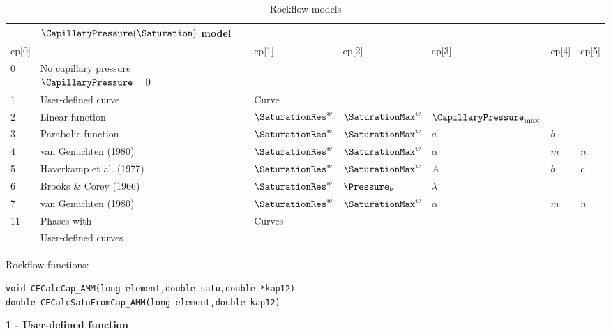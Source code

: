 \begin{table}[htb!]
\caption{Rockflow models} \label{tab:}
\begin{center}
\begin{tabular}{|ll|lllll|}
\hline
       & $\CapillaryPressure(\Saturation)$ model & & & & & \\
\hline
cp[0] &                     & cp[1] & cp[2] & cp[3] & cp[4] & cp[5]\\
\hline
0 & No capillary pressure $\CapillaryPressure = 0$   &       &       &       &       &\\
\hline
1 & User-defined curve      & Curve &       &       &       &\\
\hline
2 & Linear function         & $\SaturationRes^w$ & $\SaturationMax^w$ & ${\CapillaryPressure}_{\mbox{\footnotesize max}}$  & & \\
\hline
3 & Parabolic function      & $\SaturationRes^w$ & $\SaturationMax^w$ & $a$ & $b$ & \\
\hline
4 & van Genuchten (1980)    & $\SaturationRes^w$ & $\SaturationMax^w$ & $\alpha$ & $m$ & $n$ \\
\hline
5 & Haverkamp et al. (1977) & $\SaturationRes^w$ & $\SaturationMax^w$ & $A$ & $b$ & $c$ \\
\hline
6 & Brooks \& Corey (1966)  & $\SaturationRes^w$ & $\Pressure_b$      & $\lambda$ & & \\
\hline
7 & van Genuchten (1980)    & $\SaturationRes^w$ & $\SaturationMax^w$ & $\alpha$ & $m$ & $n$ \\
\hline
11 & Phases with         & Curves &    &&   &  \\
   & User-defined curves    &  &    &   &&  \\
\hline
\end{tabular}
\end{center}
\end{table}
%


Rockflow functions:

\texttt{void CECalcCap\_AMM(long element,double satu,double *kap12)} \\
\texttt{double CECalcSatuFromCap\_AMM(long element,double kap12)}

\vspace{5mm}

\textbf{1 - User-defined function}

\vspace{5mm}

